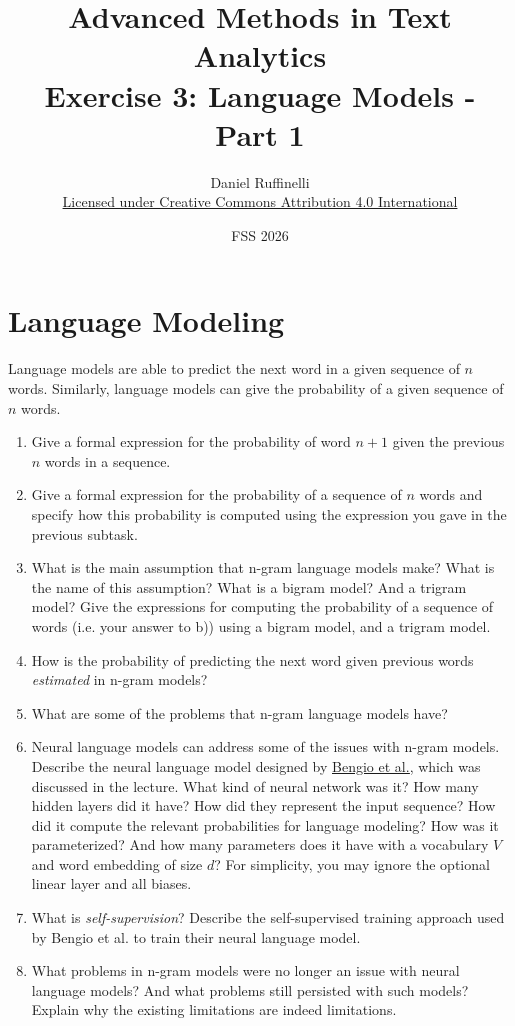 \documentclass[11pt,a4paper]{article}
\title{Advanced Methods in Text Analytics \\ 
Exercise 3: Language Models - Part 1}
\author{Daniel Ruffinelli \\ \href{https://creativecommons.org/licenses/by/4.0/}{Licensed under Creative Commons Attribution 4.0 International}}
\date{FSS 2026}
\begin{document}
\maketitle

\section{Language Modeling}

Language models are able to predict the next word in a given sequence of $n$
words. Similarly, language models can give the probability of a given
sequence of $n$ words.

\begin{enumerate}[label=(\alph*)]
    \item Give a formal expression for the probability of word $n+1$ given the
          previous $n$ words in a sequence.
    \item Give a formal expression for the probability of a sequence of $n$
          words and specify how this probability is computed using the 
          expression you gave in the previous subtask.
    \item What is the main assumption that n-gram language models make?
          What is the name of this assumption?
          What is a bigram model? And a trigram model?
          Give the expressions for computing the probability of a sequence of
          words (i.e. your answer to b)) using a bigram model, and a trigram
          model.
    \item How is the probability of predicting the next word given previous
          words \emph{estimated} in n-gram models?
    \item What are some of the problems that n-gram language models have?
    \item Neural language models can address some of the issues with n-gram
          models.
          Describe the neural language model designed by
          \href{https://www.jmlr.org/papers/volume3/bengio03a/bengio03a.pdf}{\underline{Bengio et al.}},
          which was discussed in the lecture.
          What kind of neural network was it? How many hidden layers did it
          have? How did they represent the input sequence? How did it compute
          the relevant probabilities for language modeling?
          How was it parameterized? And how many parameters does it have with a
          vocabulary $V$ and word embedding of size $d$?
          For simplicity, you may ignore the optional linear layer and all
          biases.
    \item What is \emph{self-supervision}? Describe the self-supervised training
          approach used by Bengio et al. to train their neural language model.
    \item What problems in n-gram models were no longer an issue with neural
          language models? And what problems still persisted with such models?
          Explain why the existing limitations are indeed limitations.
\end{enumerate}
\end{document}
